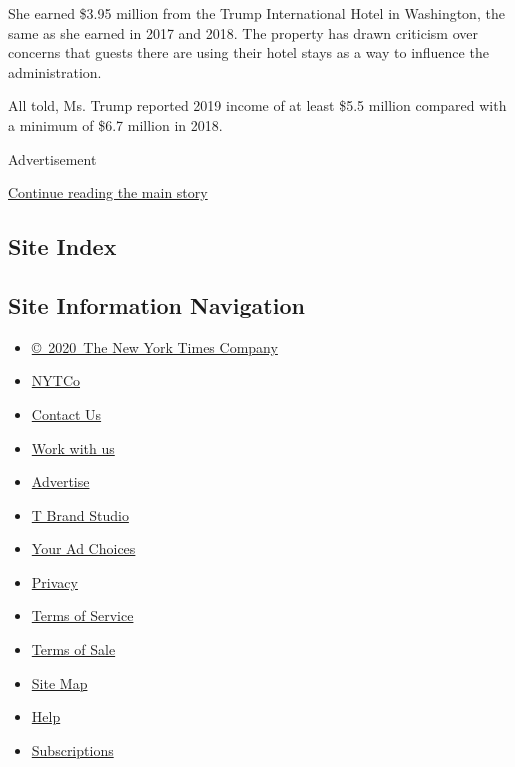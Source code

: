 She earned \$3.95 million from the Trump International Hotel in
Washington, the same as she earned in 2017 and 2018. The property has
drawn criticism over concerns that guests there are using their hotel
stays as a way to influence the administration.

All told, Ms. Trump reported 2019 income of at least \$5.5 million
compared with a minimum of \$6.7 million in 2018.

Advertisement

\protect\hyperlink{after-bottom}{Continue reading the main story}

\hypertarget{site-index}{%
\subsection{Site Index}\label{site-index}}

\hypertarget{site-information-navigation}{%
\subsection{Site Information
Navigation}\label{site-information-navigation}}

\begin{itemize}
\tightlist
\item
  \href{https://help.nytimes.com/hc/en-us/articles/115014792127-Copyright-notice}{©~2020~The
  New York Times Company}
\end{itemize}

\begin{itemize}
\tightlist
\item
  \href{https://www.nytco.com/}{NYTCo}
\item
  \href{https://help.nytimes.com/hc/en-us/articles/115015385887-Contact-Us}{Contact
  Us}
\item
  \href{https://www.nytco.com/careers/}{Work with us}
\item
  \href{https://nytmediakit.com/}{Advertise}
\item
  \href{http://www.tbrandstudio.com/}{T Brand Studio}
\item
  \href{https://www.nytimes.com/privacy/cookie-policy\#how-do-i-manage-trackers}{Your
  Ad Choices}
\item
  \href{https://www.nytimes.com/privacy}{Privacy}
\item
  \href{https://help.nytimes.com/hc/en-us/articles/115014893428-Terms-of-service}{Terms
  of Service}
\item
  \href{https://help.nytimes.com/hc/en-us/articles/115014893968-Terms-of-sale}{Terms
  of Sale}
\item
  \href{https://spiderbites.nytimes.com}{Site Map}
\item
  \href{https://help.nytimes.com/hc/en-us}{Help}
\item
  \href{https://www.nytimes.com/subscription?campaignId=37WXW}{Subscriptions}
\end{itemize}
